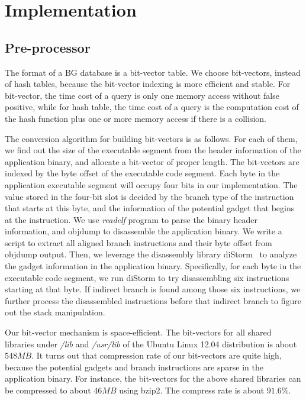 \section{Implementation} \label{sec:implement}

\subsection{Pre-processor} \label{sec:preprocessor}
The format of a BG database is a bit-vector table.
We choose bit-vectors, instead of hash tables, because
the bit-vector indexing is more efficient and stable. For bit-vector, the time
cost of a query is only one memory access without false positive,
while for hash table, the time cost of a query is the computation cost of
the hash function plus one or more memory access if there is a collision.

The conversion algorithm for building bit-vectors is as follows. For each of them,
we find out the size of the executable segment
from the header information of the application binary, and allocate
a bit-vector of proper length.
The bit-vectors are indexed by the byte offset of the executable code segment.
Each byte in the application executable segment will occupy
four bits in our implementation.
The value stored in the four-bit slot
is decided by the branch type of the instruction that starts at this byte,
and the information of the potential gadget that begins at the instruction.
We use \emph{readelf} program to parse the binary header information, and
{objdump} to disassemble the application binary. We write a script to extract
all aligned branch instructions and their byte offset from objdump output.
Then, we leverage the disassembly library diStorm~\cite{distorm} to
analyze the gadget information in the application binary. Specifically,
for each byte in the executable code segment, we run diStorm to try disassembling six
instructions starting at that byte. If indirect branch is found among
those six instructions, we further process the disassembled instructions
before that indirect branch to figure out the stack manipulation.

Our bit-vector mechanism is space-efficient. The bit-vectors for all shared libraries
under \emph{/lib} and \emph{/usr/lib} of the Ubuntu Linux 12.04 distribution is about $548MB$.
It turns out that compression rate of our bit-vectors are quite high, because the potential
gadgets and branch instructions are sparse in the application binary.
For instance, the bit-vectors for the above shared libraries can be compressed to about $46MB$
using bzip2. The compress rate is about $91.6\%$.


